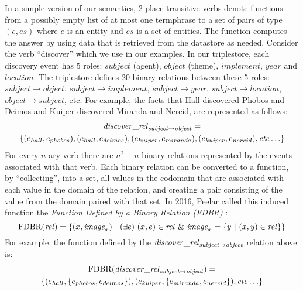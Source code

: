 \documentclass[../main.tex]{subfiles}
\begin{document}
\begin{refsection}
In a simple version of our semantics, 2-place transitive verbs denote functions from a possibly empty list of
at most one termphrase to a set of pairs of type $(e,\mathit{es})$ where $e$ is an entity and $\mathit{es}$
is a set of entities. The function computes the answer by using data that is retrieved from the datastore
as needed. Consider the verb ``discover'' which we use in our examples. In our triplestore, each
discovery event has 5 roles: $\mathit{subject}$ (agent), $\mathit{object}$ (theme), $\mathit{implement}$, $\mathit{year}$
and $\mathit{location}$. The triplestore defines 20 binary relations between these 5 roles: $\mathit{subject} \rightarrow \mathit{object}$,
$\mathit{subject} \rightarrow \mathit{implement}$, $\mathit{subject} \rightarrow \mathit{year}$, $\mathit{subject} \rightarrow \mathit{location}$, $\mathit{object} \rightarrow \mathit{subject}$, etc. For example,
the facts that Hall discovered Phobos and Deimos and Kuiper discovered Miranda and Nereid,
are represented as follows:
\begin{multline*}
	\mathit{\mathit{discover}\_rel}_{\mathit{subject} \rightarrow \mathit{object}} = \\ \{ (e_{hall}, e_{phobos}), (e_{hall}, e_{deimos}), (e_{kuiper}, e_{miranda}), (e_{kuiper}, e_{nereid}), \mathit{etc} \ldots \}
\end{multline*}
For every $n$-ary verb there are $n^2 - n$ binary relations represented by the events associated
with that verb.
Each binary relation can be converted to a function, by ``collecting'', into a set, all values
in the codomain that are associated with each value in the domain of the relation, and creating
a pair consisting of the value from the domain paired with that set. In 2016, Peelar called this induced function the {\em Function Defined by a Binary Relation (FDBR)} \cite{peelar2016accommodating}:
\begin{equation*}
	\FDBR{\mathit{rel}} = \{(x, \mathit{image}_x)\ |\ (\exists e)\ (x, e) \in \mathit{rel}\ \&\ \mathit{image}_x = \{ y\ |\ (x, y) \in \mathit{rel} \}  \}
\end{equation*}
For example, the function defined by the $\mathit{discover\_rel}_{\mathit{subject} \rightarrow \mathit{object}}$ relation above is:
\begin{multline*}
	\mathrm{FDBR}({\mathit{discover\_rel}_{\mathit{subject} \rightarrow \mathit{object}}}) = \\ \{ (e_{hall}, \{e_{phobos}, e_{deimos}\}), (e_{kuiper}, \{ e_{miranda}, e_{nereid} \}),
	\mathit{etc} \ldots \}
\end{multline*}


\end{refsection}
\end{document}
